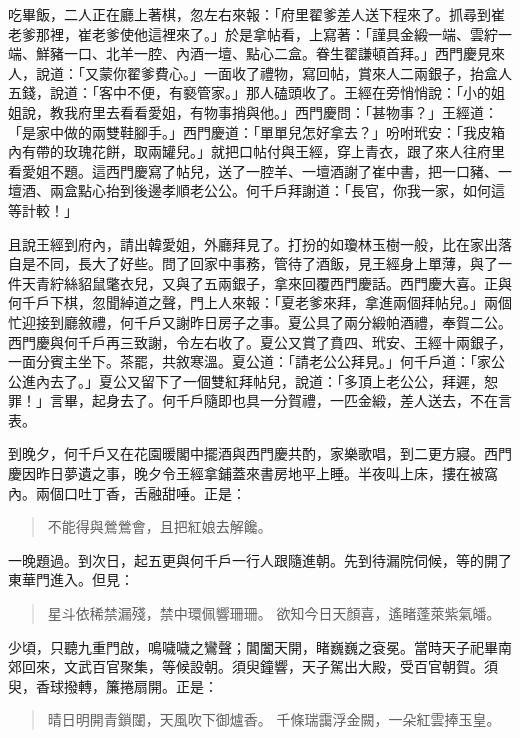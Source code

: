 吃畢飯，二人正在廳上著棋，忽左右來報：「府里翟爹差人送下程來了。抓尋到崔老爹那裡，崔老爹使他這裡來了。」於是拿帖看，上寫著：「謹具金緞一端、雲紵一端、鮮豬一口、北羊一腔、內酒一壇、點心二盒。眷生翟謙頓首拜。」西門慶見來人，說道：「又蒙你翟爹費心。」一面收了禮物，寫回帖，賞來人二兩銀子，抬盒人五錢，說道：「客中不便，有褻管家。」那人磕頭收了。王經在旁悄悄說：「小的姐姐說，教我府里去看看愛姐，有物事捎與他。」西門慶問：「甚物事？」王經道：「是家中做的兩雙鞋腳手。」西門慶道：「單單兒怎好拿去？」吩咐玳安：「我皮箱內有帶的玫瑰花餅，取兩罐兒。」就把口帖付與王經，穿上青衣，跟了來人往府里看愛姐不題。這西門慶寫了帖兒，送了一腔羊、一壇酒謝了崔中書，把一口豬、一壇酒、兩盒點心抬到後邊孝順老公公。何千戶拜謝道：「長官，你我一家，如何這等計較！」

且說王經到府內，請出韓愛姐，外廳拜見了。打扮的如瓊林玉樹一般，比在家出落自是不同，長大了好些。問了回家中事務，管待了酒飯，見王經身上單薄，與了一件天青紵絲貂鼠氅衣兒，又與了五兩銀子，拿來回覆西門慶話。西門慶大喜。正與何千戶下棋，忽聞綽道之聲，門上人來報：「夏老爹來拜，拿進兩個拜帖兒。」兩個忙迎接到廳敘禮，何千戶又謝昨日房子之事。夏公具了兩分緞帕酒禮，奉賀二公。西門慶與何千戶再三致謝，令左右收了。夏公又賞了賁四、玳安、王經十兩銀子，一面分賓主坐下。茶罷，共敘寒溫。夏公道：「請老公公拜見。」何千戶道：「家公公進內去了。」夏公又留下了一個雙紅拜帖兒，說道：「多頂上老公公，拜遲，恕罪！」言畢，起身去了。何千戶隨即也具一分賀禮，一匹金緞，差人送去，不在言表。

到晚夕，何千戶又在花園暖閣中擺酒與西門慶共酌，家樂歌唱，到二更方寢。西門慶因昨日夢遺之事，晚夕令王經拿鋪蓋來書房地平上睡。半夜叫上床，摟在被窩內。兩個口吐丁香，舌融甜唾。正是：
\begin{quote}
不能得與鶯鶯會，且把紅娘去解饞。
\end{quote}

一晚題過。到次日，起五更與何千戶一行人跟隨進朝。先到待漏院伺候，等的開了東華門進入。但見：
\begin{quote}
星斗依稀禁漏殘，禁中環佩響珊珊。
欲知今日天顏喜，遙睹蓬萊紫氣皤。
\end{quote}

少頃，只聽九重門啟，鳴噦噦之鸞聲；閶闔天開，睹巍巍之袞冕。當時天子祀畢南郊回來，文武百官聚集，等候設朝。須臾鐘響，天子駕出大殿，受百官朝賀。須臾，香球撥轉，簾捲扇開。正是：
\begin{quote}
晴日明開青鎖闥，天風吹下御爐香。
千條瑞靄浮金闕，一朵紅雲捧玉皇。
\end{quote}

